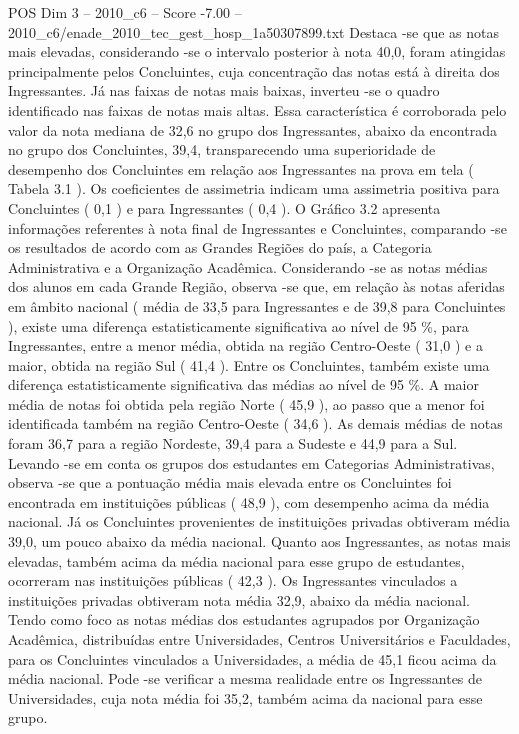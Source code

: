 \begin{textsample}{POS Dim 3 – 2010\_c6 – Score -7.00 – 2010\_c6/enade\_2010\_tec\_gest\_hosp\_1a50307899.txt}
Destaca -se que as notas mais elevadas, considerando -se o intervalo posterior à nota 40,0, foram atingidas principalmente pelos Concluintes, cuja concentração das notas está à direita dos Ingressantes.
Já nas faixas de notas mais baixas, inverteu -se o quadro identificado nas faixas de notas mais altas.
Essa característica é corroborada pelo valor da nota mediana de 32,6 no grupo dos Ingressantes, abaixo da encontrada no grupo dos Concluintes, 39,4, transparecendo uma superioridade de desempenho dos Concluintes em relação aos Ingressantes na prova em tela ( Tabela 3.1 ).
Os coeficientes de assimetria indicam uma assimetria positiva para Concluintes ( 0,1 ) e para Ingressantes ( 0,4 ).
O Gráfico 3.2 apresenta informações referentes à nota final de Ingressantes e Concluintes, comparando -se os resultados de acordo com as Grandes Regiões do país, a Categoria Administrativa e a Organização Acadêmica.
Considerando -se as notas médias dos alunos em cada Grande Região, observa -se que, em relação às notas aferidas em âmbito nacional ( média de 33,5 para Ingressantes e de 39,8 para Concluintes ), existe uma diferença estatisticamente significativa ao nível de 95 \%, para Ingressantes, entre a menor média, obtida na região Centro-Oeste ( 31,0 ) e a maior, obtida na região Sul ( 41,4 ).
Entre os Concluintes, também existe uma diferença estatisticamente significativa das médias ao nível de 95 \%.
A maior média de notas foi obtida pela região Norte ( 45,9 ), ao passo que a menor foi identificada também na região Centro-Oeste ( 34,6 ).
As demais médias de notas foram 36,7 para a região Nordeste, 39,4 para a Sudeste e 44,9 para a Sul.
Levando -se em conta os grupos dos estudantes em Categorias Administrativas, observa -se que a pontuação média mais elevada entre os Concluintes foi encontrada em instituições públicas ( 48,9 ), com desempenho acima da média nacional.
Já os Concluintes provenientes de instituições privadas obtiveram média 39,0, um pouco abaixo da média nacional.
Quanto aos Ingressantes, as notas mais elevadas, também acima da média nacional para esse grupo de estudantes, ocorreram nas instituições públicas ( 42,3 ).
Os Ingressantes vinculados a instituições privadas obtiveram nota média 32,9, abaixo da média nacional.
Tendo como foco as notas médias dos estudantes agrupados por Organização Acadêmica, distribuídas entre Universidades, Centros Universitários e Faculdades, para os Concluintes vinculados a Universidades, a média de 45,1 ficou acima da média nacional.
Pode -se verificar a mesma realidade entre os Ingressantes de Universidades, cuja nota média foi 35,2, também acima da nacional para esse grupo.

\end{textsample}
